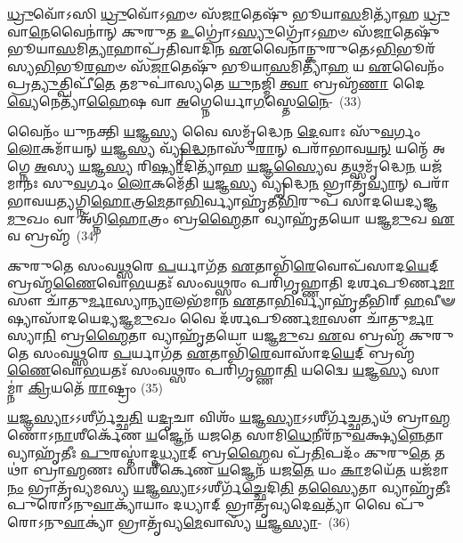 \-\ul{𑌧𑍍𑌰𑍁}\-𑌵𑍋᳴\-𑌽𑌸𑌿 \ul{𑌧𑍍𑌰𑍁}\-𑌵𑍋᳴\-𑌽𑌹𑍞 𑌸᳴\-\ul{𑌜𑌾}\-𑌤𑍇𑌷𑍁᳴ 𑌭𑍂𑌯𑌾\-\ul{𑌸}\-𑌮𑌿𑌤𑍍𑌯𑌾᳴𑌹 \ul{𑌧𑍍𑌰𑍁}\-𑌵𑌾\-\ul{𑌨𑍇}\-𑌵𑍈𑌨𑌾॑𑌨𑍍 𑌕𑍁𑌰𑍁𑌤 \ul{𑌉}\-𑌗𑍍𑌰𑍋॑\-𑌽\-\ul{𑌸𑍍𑌯𑍁}\-𑌗𑍍𑌰𑍋᳴\-𑌽𑌹𑍞 𑌸᳴\-\ul{𑌜𑌾}\-𑌤𑍇𑌷𑍁᳴ 𑌭𑍂𑌯𑌾\-\ul{𑌸}\-𑌮𑌿\-\ul{𑌤𑍍𑌯𑌾}\-𑌹𑌾𑌪𑍍𑌰᳴𑌤𑌿𑌵𑌾𑌦𑌿𑌨 \ul{𑌏}\-𑌵𑍈𑌨𑌾॑𑌨𑍍𑌕𑍁𑌰𑍁𑌤𑍇\-𑌽\-\ul{𑌭𑌿}\-𑌭𑍂𑌰᳴𑌸𑍍𑌯\-\ul{𑌭𑌿}\-𑌭𑍂\-\ul{𑌰}\-𑌹𑍞 𑌸᳴\-\ul{𑌜𑌾}\-𑌤𑍇𑌷𑍁᳴ 𑌭𑍂𑌯𑌾\-\ul{𑌸}\-𑌮𑌿𑌤𑍍𑌯𑌾᳴\-\ul{𑌹} 𑌯 \ul{𑌏}\-𑌵𑍈𑌨𑌂᳴ 𑌪𑍍𑌰\-\ul{𑌤𑍍𑌯𑍁}\-𑌤𑍍𑌪𑌿𑌪𑍀᳴\-\ul{𑌤𑍇} 𑌤𑌮𑍁𑌪𑌾॑𑌸𑍍𑌯𑌤𑍇 \ul{𑌯𑍁}\-𑌨𑌜𑍍𑌮𑌿᳴ \ul{𑌤𑍍𑌵𑌾} 𑌬𑍍𑌰𑌹𑍍𑌮᳴\-\ul{𑌣𑌾} 𑌦𑍈\-\ul{𑌵𑍍𑌯𑍇}\-𑌨𑍇𑌤𑍍𑌯𑌾᳴\-\ul{𑌹𑍈}\-𑌷 𑌵𑌾 \ul{𑌅}\-𑌗𑍍𑌨𑍇𑌰𑍍𑌯𑍋\-\ul{𑌗}\-𑌸𑍍𑌤𑍇\-\ul{𑌨𑍈}\--~(33)

𑌵𑍈𑌨𑌂᳴ 𑌯𑍁𑌨𑌕𑍍𑌤𑌿 \ul{𑌯}\-𑌜𑍍𑌞\-\ul{𑌸𑍍𑌯} 𑌵𑍈 𑌸𑌮𑍃᳴𑌦𑍍𑌧𑍇𑌨 \ul{𑌦𑍇}\-𑌵𑌾𑌃 𑌸𑍁᳴\-\ul{𑌵}\-𑌰𑍍𑌗𑌂 \ul{𑌲𑍋}\-𑌕𑌮𑌾᳴𑌯𑌨𑍍 \ul{𑌯}\-𑌜𑍍𑌞\-\ul{𑌸𑍍𑌯} 𑌵𑍍𑌯𑍃᳴\-\ul{𑌦𑍍𑌧𑍇}\-𑌨𑌾𑌸𑍁᳴\-\ul{𑌰𑌾}\-𑌨𑍍 𑌪𑌰𑌾᳴𑌭𑌾𑌵\-\ul{𑌯}\-\-\ul{𑌨𑍍} 𑌯𑌨𑍍𑌮𑍇᳴ 𑌅𑌗𑍍𑌨𑍇 \ul{𑌅}\-𑌸𑍍𑌯 \ul{𑌯}\-𑌜𑍍𑌞\-\ul{𑌸𑍍𑌯} 𑌰𑌿\-\ul{𑌷𑍍𑌯𑌾}\-𑌦𑌿𑌤𑍍𑌯𑌾᳴𑌹 \ul{𑌯}\-𑌜𑍍𑌞\-\ul{𑌸𑍍𑌯𑍈}\-𑌵 𑌤𑌥𑍍𑌸𑌮𑍃᳴𑌦𑍍𑌧𑍇\-\ul{𑌨} 𑌯𑌜᳴𑌮𑌾𑌨𑌃 𑌸𑍁\-\ul{𑌵}\-𑌰𑍍𑌗𑌂 \ul{𑌲𑍋}\-𑌕𑌮𑍇᳴𑌤𑌿 \ul{𑌯}\-𑌜𑍍𑌞\-\ul{𑌸𑍍𑌯} 𑌵𑍍𑌯𑍃᳴𑌦𑍍𑌧𑍇\-\ul{𑌨} 𑌭𑍍𑌰𑌾𑌤𑍃᳴\-\ul{𑌵𑍍𑌯𑌾}\-𑌨𑍍 𑌪𑌰𑌾᳴ 𑌭𑌾𑌵𑌯𑌤𑍍𑌯𑌗𑍍𑌨𑌿\-\ul{𑌹𑍋}\-𑌤𑍍𑌰\-\ul{𑌮𑍇}\-𑌤𑌾\-\ul{𑌭𑌿}\-𑌰𑍍𑌵𑍍𑌯𑌾𑌹𑍃᳴𑌤𑍀\-\ul{𑌭𑌿}\-𑌰𑍁𑌪᳴ 𑌸𑌾𑌦𑌯𑍇𑌦𑍍𑌯𑌜𑍍𑌞\-\ul{𑌮𑍁}\-𑌖𑌂 𑌵𑌾 𑌅᳴𑌗𑍍𑌨𑌿\-\ul{𑌹𑍋}\-𑌤𑍍𑌰𑌂 𑌬𑍍𑌰\-\ul{𑌹𑍍𑌮𑍈}\-𑌤𑌾 𑌵𑍍𑌯𑌾𑌹𑍃᳴𑌤𑌯𑍋 𑌯𑌜𑍍𑌞\-\ul{𑌮𑍁}\-𑌖 \ul{𑌏}\-𑌵 𑌬𑍍𑌰𑌹𑍍𑌮᳴~(34)

𑌕𑍁𑌰𑍁𑌤𑍇 𑌸𑌂𑌵\-\ul{𑌥𑍍𑌸}\-𑌰𑍇 \ul{𑌪}\-𑌰𑍍𑌯𑌾𑌗᳴𑌤 \ul{𑌏}\-𑌤𑌾𑌭𑌿᳴\-\ul{𑌰𑍇}\-𑌵𑍋𑌪᳴𑌸𑌾𑌦\-\ul{𑌯𑍇}\-𑌦𑍍 𑌬𑍍𑌰𑌹𑍍𑌮᳴\-\ul{𑌣𑍈}\-𑌵𑍋\-\ul{𑌭}\-𑌯𑌤𑌃᳴ 𑌸𑌂𑌵\-\ul{𑌥𑍍𑌸}\-𑌰𑌂 𑌪𑌰𑌿᳴𑌗𑍃𑌹𑍍𑌣𑌾𑌤𑌿 𑌦𑌰𑍍\mbox{}𑌶𑌪𑍂𑌰𑍍𑌣\-\ul{𑌮𑌾}\-𑌸𑍗 𑌚𑌾᳴𑌤𑍁\-\ul{𑌰𑍍𑌮𑌾}\-𑌸𑍍𑌯𑌾\-\ul{𑌨𑍍𑌯𑌾}\-𑌲𑌭᳴𑌮𑌾𑌨 \ul{𑌏}\-𑌤𑌾\-\ul{𑌭𑌿}\-𑌰𑍍𑌵𑍍𑌯𑌾𑌹𑍃᳴𑌤𑍀𑌭𑌿𑌰𑍍\mbox{} \ul{𑌹}\-𑌵𑍀𑍟𑌷𑍍𑌯𑌾𑌸𑌾᳴𑌦\-𑌯𑍇𑌦𑍍𑌯𑌜𑍍𑌞\-\ul{𑌮𑍁}\-𑌖𑌂 𑌵𑍈 𑌦᳴𑌰𑍍\mbox{}𑌶𑌪𑍂𑌰𑍍𑌣\-\ul{𑌮𑌾}\-𑌸𑍗 𑌚𑌾᳴𑌤𑍁\-\ul{𑌰𑍍𑌮𑌾}\-𑌸𑍍𑌯𑌾\-\ul{𑌨𑌿} 𑌬𑍍𑌰\-\ul{𑌹𑍍𑌮𑍈}\-𑌤𑌾 𑌵𑍍𑌯𑌾𑌹𑍃᳴𑌤𑌯𑍋 𑌯𑌜𑍍𑌞\-\ul{𑌮𑍁}\-𑌖 \ul{𑌏}\-𑌵 𑌬𑍍𑌰𑌹𑍍𑌮᳴ 𑌕𑍁𑌰𑍁𑌤𑍇 𑌸𑌂𑌵\-\ul{𑌥𑍍𑌸}\-𑌰𑍇 \ul{𑌪}\-𑌰𑍍𑌯𑌾𑌗᳴𑌤 \ul{𑌏}\-𑌤𑌾𑌭𑌿᳴\-\ul{𑌰𑍇}\-𑌵𑌾𑌸𑌾᳴𑌦\-\-\ul{𑌯𑍇}\-𑌦𑍍 𑌬𑍍𑌰𑌹𑍍𑌮᳴\-\ul{𑌣𑍈}\-𑌵𑍋\-\ul{𑌭}\-𑌯𑌤𑌃᳴ 𑌸𑌂𑌵\-\ul{𑌥𑍍𑌸}\-𑌰𑌂 𑌪𑌰𑌿᳴𑌗𑍃𑌹𑍍𑌣𑌾\-\ul{𑌤𑌿} 𑌯𑌦𑍍𑌵𑍈 \ul{𑌯}\-𑌜𑍍𑌞\-\ul{𑌸𑍍𑌯} 𑌸𑌾𑌮𑍍𑌨𑌾॑ \ul{𑌕𑍍𑌰𑌿}\-𑌯𑌤𑍇᳴ \ul{𑌰𑌾}\-𑌷𑍍𑌟𑍍𑌰𑌂~(35)

\-\ul{𑌯}\-𑌜𑍍𑌞\-\ul{𑌸𑍍𑌯𑌾}\-\-𑌽\-𑌽𑌶𑍀𑌰𑍍𑌗᳴𑌚𑍍𑌛\-\ul{𑌤𑌿} 𑌯\-\ul{𑌦𑍃}\-𑌚𑌾 𑌵𑌿𑌶𑌂᳴ \ul{𑌯}\-𑌜𑍍𑌞\-\ul{𑌸𑍍𑌯𑌾}\-\-𑌽\-𑌽𑌶𑍀𑌰𑍍𑌗᳴\-\ul{𑌚𑍍𑌛}\-𑌤𑍍𑌯𑌥᳴ 𑌬𑍍𑌰𑌾\-\ul{𑌹𑍍𑌮}\-𑌣𑍋᳴\-𑌽\-\ul{𑌨𑌾}\-𑌶𑍀𑌰𑍍𑌕𑍇᳴𑌣 \ul{𑌯}\-𑌜𑍍𑌞𑍇𑌨᳴ 𑌯𑌜𑌤𑍇 𑌸𑌾𑌮𑌿\-\ul{𑌧𑍇}\-𑌨𑍀𑌰᳴𑌨𑍁\-\ul{𑌵}\-𑌕𑍍𑌷𑍍𑌯\-\ul{𑌨𑍍𑌨𑍇}\-𑌤𑌾 𑌵𑍍𑌯𑌾𑌹𑍃᳴𑌤𑍀𑌃 \ul{𑌪𑍁}\-𑌰𑌸𑍍𑌤𑌾॑𑌦𑍍𑌦\-\ul{𑌧𑍍𑌯𑌾}\-𑌦𑍍 𑌬𑍍𑌰\-\ul{𑌹𑍍𑌮𑍈}\-𑌵 𑌪𑍍𑌰᳴\-\ul{𑌤𑌿}\-𑌪𑌦𑌂᳴ 𑌕𑍁𑌰𑍁\-\ul{𑌤𑍇} 𑌤𑌥𑌾॑ 𑌬𑍍𑌰𑌾\-\ul{𑌹𑍍𑌮}\-𑌣𑌃 𑌸𑌾𑌶𑍀॑𑌰𑍍𑌕𑍇𑌣 \ul{𑌯}\-𑌜𑍍𑌞𑍇𑌨᳴ 𑌯𑌜\-\ul{𑌤𑍇} 𑌯𑌂 \ul{𑌕𑌾}\-𑌮𑌯𑍇᳴\-\ul{𑌤} 𑌯𑌜᳴𑌮𑌾\-\ul{𑌨𑌂} 𑌭𑍍𑌰𑌾𑌤𑍃᳴𑌵𑍍𑌯𑌮𑌸𑍍𑌯 \ul{𑌯}\-𑌜𑍍𑌞\-\ul{𑌸𑍍𑌯𑌾}\-\-𑌽\-𑌽𑌶𑍀𑌰𑍍𑌗᳴\-\ul{𑌚𑍍𑌛𑍇}\-𑌦𑌿\-\ul{𑌤𑌿} 𑌤\-\ul{𑌸𑍍𑌯𑍈}\-𑌤𑌾 𑌵𑍍𑌯𑌾𑌹𑍃᳴𑌤𑍀𑌃 𑌪𑍁𑌰𑍋\-𑌽𑌨𑍁\-\ul{𑌵𑌾}\-𑌕𑍍𑌯𑌾᳴𑌯𑌾𑌂 𑌦𑌧𑍍𑌯𑌾𑌦𑍍 𑌭𑍍𑌰𑌾𑌤𑍃𑌵𑍍𑌯𑌦𑍇\-\ul{𑌵}\-𑌤𑍍𑌯𑌾᳴ 𑌵𑍈 𑌪𑍁᳴𑌰𑍋\-𑌽𑌨𑍁\-\ul{𑌵𑌾}\-𑌕𑍍𑌯𑌾॑ 𑌭𑍍𑌰𑌾𑌤𑍃᳴𑌵𑍍𑌯\-\ul{𑌮𑍇}\-𑌵𑌾𑌸𑍍𑌯᳴ \ul{𑌯}\-𑌜𑍍𑌞\-\ul{𑌸𑍍𑌯𑌾}\--~(36)

